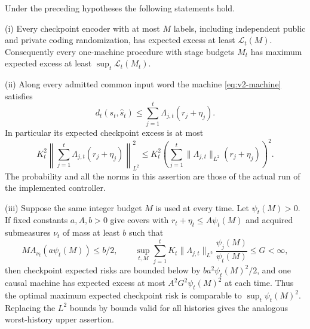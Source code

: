 \begin{theorem}
\label{thm:v2-resolution}
Under the preceding hypotheses the following statements hold.

\textup{(i)} Every checkpoint encoder with at most $M$ labels, including
independent public and private coding randomization, has expected excess
at least $\mathcal L_t(M)$. Consequently every one-machine procedure with
stage budgets $M_t$ has maximum expected excess at least
$\sup_t\mathcal L_t(M_t)$.

\textup{(ii)} Along every admitted common input word the machine
\eqref{eq:v2-machine} satisfies
\begin{equation}\label{eq:v2-hybrid}
 d_t(s_t,\widehat s_t)
 \le\sum_{j=1}^t\Lambda_{j,t}(r_j+\eta_j).
\end{equation}
In particular its expected checkpoint excess is at most
\begin{equation}\label{eq:v2-mean-upper}
 K_t^2\left\|\sum_{j=1}^t\Lambda_{j,t}(r_j+\eta_j)\right\|_{L^2}^2
 \le K_t^2\left(\sum_{j=1}^t
               \|\Lambda_{j,t}\|_{L^2}(r_j+\eta_j)\right)^2.
\end{equation}
The probability and all the norms in this assertion are those of the
actual run of the implemented controller.

\textup{(iii)} Suppose the same integer budget $M$ is used at every time.
Let $\psi_t(M)>0$. If fixed constants $a,A,b>0$ give covers with
$r_t+\eta_t\le A\psi_t(M)$ and acquired submeasures $\nu_t$ of mass
at least $b$ such that
\[
 M A_{\nu_t}(a\psi_t(M))\le b/2,
 \qquad
 \sup_{t,M}\sum_{j=1}^t
 K_t\|\Lambda_{j,t}\|_{L^2}\frac{\psi_j(M)}{\psi_t(M)}\le G<\infty,
\]
then checkpoint expected risks are bounded below by
$ba^2\psi_t(M)^2/2$, and one causal machine has expected excess at most
$A^2G^2\psi_t(M)^2$ at each time. Thus the optimal maximum expected
checkpoint risk is comparable to $\sup_t\psi_t(M)^2$. Replacing the
$L^2$ bounds by bounds valid for all histories gives the analogous
worst-history upper assertion.
\end{theorem}
